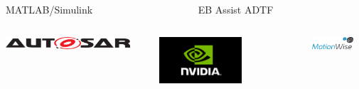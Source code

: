 \begin{frame}
\begin{columns}[]
\begin{column}{0.33\textwidth}
        \centering
        \footnotesize
        MATLAB/Simulink\footnotemark[2]
    \end{column}
    \begin{column}{0.33\textwidth}
        \centering
        \footnotesize
        EB Assist ADTF\footnotemark[3]
    \end{column}
\end{columns}
\vspace{0.25cm}
\begin{columns}[]
    \begin{column}{0.33\textwidth}
        \centering
        \includegraphics[width=0.9\textwidth]{images/logo_autosar.png}\\
    \end{column}
    \begin{column}{0.33\textwidth}
        \centering
        \includegraphics[width=0.6\textwidth]{images/logo_nvidia.png}\\
    \end{column}
    \begin{column}{0.33\textwidth}
        \centering
        \includegraphics[width=0.8\textwidth]{images/logo_motionwise.png}\\
    \end{column}
\end{columns}
\vspace{0.2cm}
\begin{columns}[]
    \begin{column}{0.33\textwidth}
        \centering
        \footnotesize

\end{column}
\end{columns}
\end{frame}
